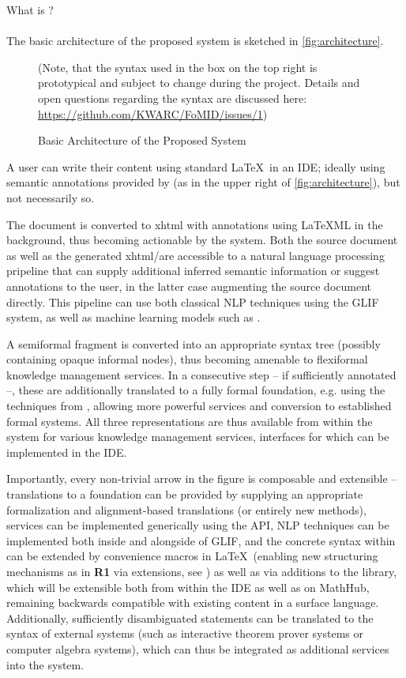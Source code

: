 \begin{sfragment}{What is \sTeX?}
{\paragraph{} The basic architecture of the proposed system is sketched in
\autoref{fig:architecture}.
\begin{figure}\centering
  {\small (Note, that the syntax used
    in the box on the top right is prototypical and subject to change during the project.
    Details and open questions regarding the syntax are discussed here:
    \url{https://github.com/KWARC/FoMID/issues/1})}
  \caption{Basic Architecture of the Proposed System}\label{fig:architecture}
\end{figure}
A user can write their content using standard \LaTeX\ in an IDE;
ideally using semantic annotations provided by \sTeX
(as in the upper right of 
\autoref{fig:architecture}), but not necessarily so.

The document is converted to xhtml with \omdoc annotations
using \LaTeX ML in the background,
thus becoming actionable by the \mmt system. Both the source document
as well as the generated xhtml/\omdoc are accessible to a natural language
processing pripeline that can supply additional inferred semantic 
information or suggest annotations to the user, in the latter case 
augmenting the source document directly. This pipeline can use both 
classical NLP techniques using the GLIF system, as well as machine 
learning models such as \cite{own:fifom}.

A semiformal fragment is converted 
into an appropriate syntax tree (possibly containing opaque
informal nodes), 
thus becoming amenable
to flexiformal knowledge management services. In a consecutive step
-- if sufficiently annotated --, these are
additionally translated
to a fully formal foundation, e.g. using the techniques from 
\cite{DMueller:phd:19,own:translations}, allowing
more powerful services and conversion to established formal
systems. All three representations
are thus available from within the \mmt system for various
knowledge management services, interfaces for which can be
implemented in the IDE.

Importantly, every non-trivial arrow in the figure is 
composable and extensible -- 
translations to a foundation can be provided
by supplying an appropriate formalization and alignment-based
translations (or entirely new methods),
services can be implemented generically using the \mmt API,
NLP techniques can be implemented both inside and alongside of
GLIF, and the concrete syntax within \sTeX can be extended
by convenience macros in \LaTeX\ (enabling new
structuring mechanisms as in \textbf{R1} via 
\mmt extensions, see
\cite{MueRabRot:rslffml20}) as well as via additions to
the library, which will be extensible both from within the IDE
as well as on MathHub,
remaining backwards compatible with existing content in a surface 
language. Additionally, sufficiently disambiguated
statements can be translated to the syntax of 
external systems (such as interactive theorem prover systems
or computer algebra systems),
which can thus be integrated as additional services into the system.
}


\end{sfragment}
